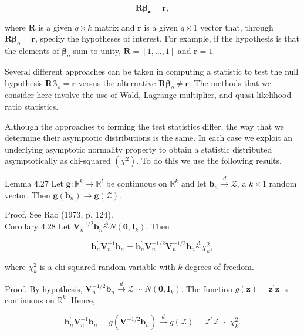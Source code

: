 \documentclass[10pt]{article}
\begin{document}
$$
\mathbf{R} \boldsymbol{\beta}_{\bullet}=\mathbf{r},
$$

where $\mathbf{R}$ is a given $q \times k$ matrix and $\mathbf{r}$ is a given $q \times 1$ vector that, through $\mathbf{R} \boldsymbol{\beta}_{o}=\mathbf{r}$, specify the hypotheses of interest. For example, if the hypothesis is that the elements of $\boldsymbol{\beta}_{o}$ sum to unity, $\mathbf{R}=[1, \ldots, 1]$ and $\mathbf{r}=1$.

Several different approaches can be taken in computing a statistic to test the null hypothesis $\mathbf{R} \boldsymbol{\beta}_{o}=\mathbf{r}$ versus the alternative $\mathbf{R} \boldsymbol{\beta}_{o} \neq \mathbf{r}$. The methods that we consider here involve the use of Wald, Lagrange multiplier, and quasi-likelihood ratio statistics.

Although the approaches to forming the test statistics differ, the way that we determine their asymptotic distributions is the same. In each case we exploit an underlying asymptotic normality property to obtain a statistic distributed asymptotically as chi-squared $\left(\chi^{2}\right)$. To do this we use the following results.

Lemma 4.27 Let $\mathbf{g}: \mathbb{R}^{k} \rightarrow \mathbb{R}^{l}$ be continuous on $\mathbb{R}^{k}$ and let $\mathbf{b}_{n} \xrightarrow{d} \mathcal{Z}$, a $k \times 1$ random vector. Then $\mathbf{g}\left(\mathbf{b}_{n}\right) \rightarrow \mathbf{g}(\mathcal{Z})$.

Proof. See Rao (1973, p. 124).\\
Corollary 4.28 Let $\mathbf{V}_{n}^{-1 / 2} \mathbf{b}_{n} \stackrel{A}{\sim} N\left(\mathbf{0}, \mathbf{I}_{k}\right)$. Then

$$
\mathbf{b}_{n}^{\prime} \mathbf{V}_{n}^{-1} \mathbf{b}_{n}=\mathbf{b}_{n}^{\prime} \mathbf{V}_{n}^{-1 / 2} \mathbf{V}_{n}^{-1 / 2} \mathbf{b}_{n} \stackrel{A}{\sim} \chi_{k}^{2},
$$

where $\chi_{k}^{2}$ is a chi-squared random variable with $k$ degrees of freedom.

Proof. By hypothesis, $\mathbf{V}_{n}^{-1 / 2} \mathbf{b}_{n} \xrightarrow{d} \mathcal{Z} \sim N\left(\mathbf{0}, \mathbf{I}_{k}\right)$. The function $g(\mathbf{z})= \mathbf{z}^{\prime} \mathbf{z}$ is continuous on $\mathbb{R}^{k}$. Hence,

$$
\mathbf{b}_{n}^{\prime} \mathbf{V}_{n}^{-1} \mathbf{b}_{n}=g\left(\mathbf{V}^{-1 / 2} \mathbf{b}_{n}\right) \xrightarrow{d} g(\mathcal{Z})=\mathcal{Z}^{\prime} \mathcal{Z} \sim \chi_{k}^{2} .
$$
\end{document}
